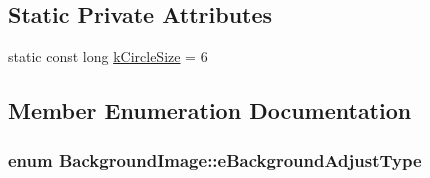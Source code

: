 \subsection*{Static Private Attributes}
\begin{DoxyCompactItemize}
\item 
static const long \hyperlink{a00017_a0a6ebc863581593e9be0666a273dd634}{k\-Circle\-Size} = 6
\end{DoxyCompactItemize}


\subsection{Member Enumeration Documentation}
\hypertarget{a00017_a3927289a3b88bbf9320c2dfe3271c1ae}{
\subsubsection[{e\-Background\-Adjust\-Type}]{\setlength{\rightskip}{0pt plus 5cm}enum {\bf Background\-Image\-::e\-Background\-Adjust\-Type}\hspace{0.3cm}{\ttfamily [private]}}}\label{a00017_a3927289a3b88bbf9320c2dfe3271c1ae}
